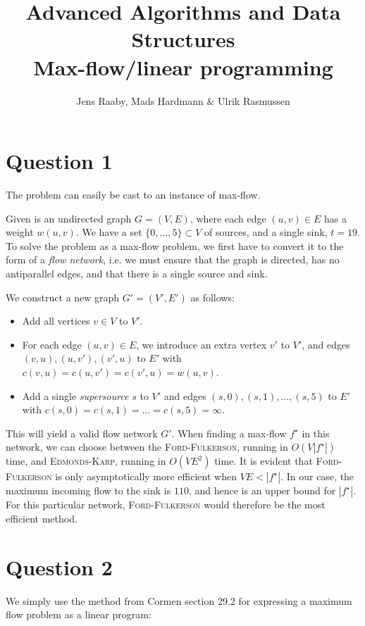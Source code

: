 \documentclass[a4paper, 10pt, oneside, article]{memoir}
\title{Advanced Algorithms and Data Structures\\Max-flow/linear programming}
\author{Jens Raaby, Mads Hardmann \& Ulrik Rasmussen}
\begin{document}
\maketitle

\section*{Question 1}

The problem can easily be cast to an instance of max-flow.

Given is an undirected graph $G = (V, E)$, where each edge $(u,v) \in
E$ has a weight $w(u,v)$. We have a set $\{0, ..., 5\} \subset V$ of
sources, and a single sink, $t=19$. To solve the problem as a max-flow
problem, we first have to convert it to the form of a \emph{flow
  network}, i.e. we must ensure that the graph is directed, has no
antiparallel edges, and that there is a single source and sink.

We construct a new graph $G' = (V', E')$ as follows:

\begin{itemize}
\item Add all vertices $v \in V$ to $V'$.
\item For each edge $(u,v) \in E$, we introduce an extra vertex $v'$
  to $V'$, and edges $(v,u), (u,v'), (v', u)$ to $E'$ with $c(v,u) =
  c(u,v') = c(v', u) = w(u,v)$.
\item Add a single \emph{supersource} $s$ to $V'$ and edges $(s,0),
  (s,1), ..., (s,5)$ to $E'$ with $c(s,0) = c(s, 1) = ... = c(s,5) =
  \infty$.
\end{itemize}

This will yield a valid flow network $G'$. When finding a max-flow
$f^\star$ in this network, we can choose between the
\textsc{Ford-Fulkerson}, running in $O(V |f^\star|)$ time, and
\textsc{Edmonds-Karp}, running in $O(VE^2)$ time. It is evident that
\textsc{Ford-Fulkerson} is only asymptotically more efficient when $VE
< |f^\star|$. In our case, the maximum incoming flow to the sink is
$110$, and hence is an upper bound for $|f^\star|$. For this
particular network, \textsc{Ford-Fulkerson} would therefore be the
most efficient method.


\section*{Question 2}

We simply use the method from Cormen section 29.2 for expressing a
maximum flow problem as a linear program:
\end{document}
